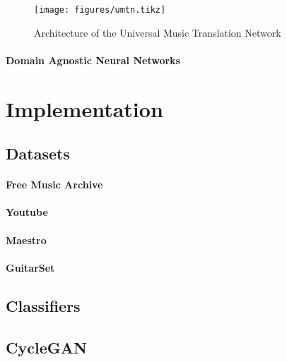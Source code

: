 \documentclass[]{article}
\begin{document}
\begin{figure}[h]
    \texttt{[image: figures/umtn.tikz]}
\centering 
\caption{Architecture of the Universal Music Translation Network \label{fig:facebook}}
\end{figure}

\hypertarget{domain-agnostic-neural-networks}{%
\paragraph{Domain Agnostic Neural
Networks}\label{domain-agnostic-neural-networks}}

\hypertarget{implementation}{%
\section{Implementation}\label{implementation}}

\hypertarget{datasets}{%
\subsection{Datasets}\label{datasets}}

\paragraph{Free Music Archive}

\paragraph{Youtube}

\paragraph{Maestro}

\paragraph{GuitarSet}

\hypertarget{classifiers-1}{%
\subsection{Classifiers}\label{classifiers-1}}

\hypertarget{cyclegan-1}{%
\subsection{CycleGAN}\label{cyclegan-1}}
\end{document}
